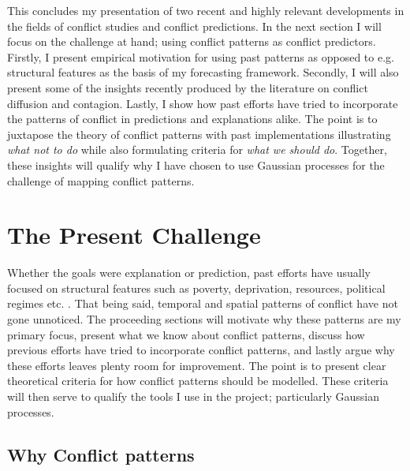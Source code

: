 \documentclass[a4paper]{article}
\begin{document}
This concludes my presentation of two recent and highly relevant developments in the fields of conflict studies and conflict predictions. In the next section I will focus on the challenge at hand; using conflict patterns as conflict predictors. Firstly, I present empirical motivation for using past patterns as opposed to e.g. structural features as the basis of my forecasting framework. Secondly, I will also present some of the insights recently produced by the literature on conflict diffusion and contagion. Lastly, I show how past efforts have tried to incorporate the patterns of conflict in predictions and explanations alike. The point is to juxtapose the theory of conflict patterns with past implementations illustrating \emph{what not to do} while also formulating criteria for \emph{what we should do}. Together, these insights will qualify why I have chosen to use Gaussian processes for the challenge of mapping conflict patterns.\par

\section{The Present Challenge} %

Whether the goals were explanation or prediction, past efforts have usually focused on structural features such as poverty, deprivation, resources, political regimes etc. \citep[10]{chadefaux2017conflict}. That being said, temporal and spatial patterns of conflict have not gone unnoticed. The proceeding sections will motivate why these patterns are my primary focus, present what we know about conflict patterns, discuss how previous efforts have tried to incorporate conflict patterns, and lastly argue why these efforts leaves plenty room for improvement. The point is to present clear theoretical criteria for how conflict patterns should be modelled. These criteria will then serve to qualify the tools I use in the project; particularly Gaussian processes.\par 

\subsection{Why Conflict patterns}
\end{document}

